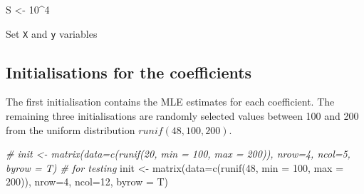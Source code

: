 \documentclass[
]{article}
\newenvironment{Shaded}{\begin{snugshade}}{\end{snugshade}}
\newcommand{\AttributeTok}[1]{\textcolor[rgb]{0.77,0.63,0.00}{#1}}
\newcommand{\CommentTok}[1]{\textcolor[rgb]{0.56,0.35,0.01}{\textit{#1}}}
\newcommand{\DecValTok}[1]{\textcolor[rgb]{0.00,0.00,0.81}{#1}}
\newcommand{\FunctionTok}[1]{\textcolor[rgb]{0.00,0.00,0.00}{#1}}
\newcommand{\NormalTok}[1]{#1}
\newcommand{\OtherTok}[1]{\textcolor[rgb]{0.56,0.35,0.01}{#1}}
\newcommand{\SpecialCharTok}[1]{\textcolor[rgb]{0.00,0.00,0.00}{#1}}
\begin{document}
\begin{Shaded}
\begin{Highlighting}[]
\NormalTok{S }\OtherTok{\textless{}{-}} \DecValTok{10}\SpecialCharTok{\^{}}\DecValTok{4}
\end{Highlighting}
\end{Shaded}

Set \texttt{X} and \texttt{y} variables

\begin{Shaded}
\end{Shaded}

\hypertarget{initialisations-for-the-coefficients}{%
\subsection{Initialisations for the
coefficients}\label{initialisations-for-the-coefficients}}

The first initialisation contains the MLE estimates for each
coefficient. The remaining three initialisations are randomly selected
values between 100 and 200 from the uniform distribution
\(runif(48, 100, 200)\).

\begin{Shaded}
\begin{Highlighting}[]
\CommentTok{\# init \textless{}{-} matrix(data=c(runif(20, min = 100, max = 200)), nrow=4, ncol=5, byrow = T)  \# for testing}
\NormalTok{init }\OtherTok{\textless{}{-}} \FunctionTok{matrix}\NormalTok{(}\AttributeTok{data=}\FunctionTok{c}\NormalTok{(}\FunctionTok{runif}\NormalTok{(}\DecValTok{48}\NormalTok{, }\AttributeTok{min =} \DecValTok{100}\NormalTok{, }\AttributeTok{max =} \DecValTok{200}\NormalTok{)), }\AttributeTok{nrow=}\DecValTok{4}\NormalTok{, }\AttributeTok{ncol=}\DecValTok{12}\NormalTok{, }\AttributeTok{byrow =}\NormalTok{ T)}
\end{Highlighting}
\end{Shaded}
\end{document}
